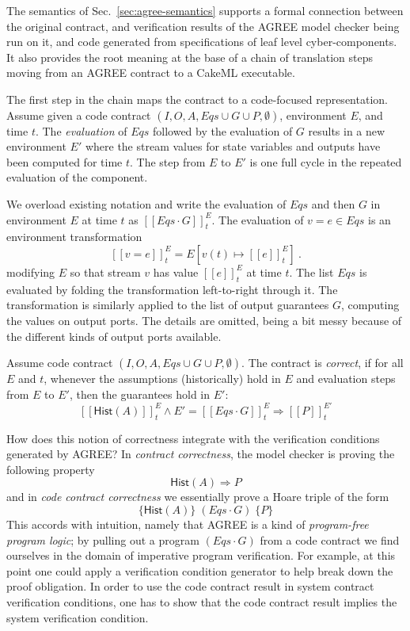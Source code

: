 \documentclass[global,twocolumn]{svjour}
\newcommand{\konst}[1]{\ensuremath{\mathsf{#1}}}
\newcommand{\imp}{\Rightarrow}
\newcommand{\set}[1]{\ensuremath{\{ {#1} \}}}
\newcommand{\sem}[1]{\ensuremath{[\![ #1 ]\!]}}
\newcommand{\Eqs}{\ensuremath{\mathit{Eqs}}}
\newcommand{\secref}[1]{Sec.~\ref{#1}}
\begin{document}
The semantics of \secref{sec:agree-semantics} supports a formal connection between the original contract, and verification results of the AGREE model checker being run on it, and code generated from specifications of leaf level cyber-components.
%
It also provides the root meaning at the base of a chain of translation steps moving from an AGREE contract to a CakeML executable.

The first step in the chain maps the contract to a code-focused representation.
Assume given a code contract $(I,O,A,\mathit{Eqs} \cup G \cup P,\emptyset)$, environment $E$, and time $t$.
%
The \emph{evaluation} of $\mathit{Eqs}$ followed by the evaluation of $G$ results in a new environment $E'$ where the stream values for state variables and outputs have been computed for time $t$.
%
The step from $E$ to $E'$ is one full cycle in the repeated evaluation of the component.

\begin{definition}[Evaluation]
We overload existing notation and write the evaluation of $\mathit{Eqs}$ and then $G$ in environment $E$ at time $t$ as $\sem{\mathit{Eqs}\cdot G}^E_t$.
%
The evaluation of $v = e \in {\Eqs}$ is an environment transformation
%
\[
 \sem{v = e}^E_t = E[v(t) \mapsto\sem{e}^E_t] \ .
\]
%
modifying $E$ so that stream $v$ has value $\sem{e}^E_t$ at time $t$.
%
The list {\Eqs} is evaluated by folding the transformation left-to-right through it.
%
The transformation is similarly applied to the list of output guarantees $G$, computing the values on output ports.
%
The details are omitted, being a bit messy because of the different kinds of output ports available.
\end{definition}

\begin{definition}
Assume code contract $(I,O,A,\mathit{Eqs} \cup G \cup P,\emptyset)$.
%
The contract is \emph{correct}, if for all $E$ and $t$, whenever the assumptions (historically) hold in $E$ and evaluation steps from $E$ to $E'$, then the guarantees hold in $E'$:
%
\[
\sem{\konst{Hist}(A)}^E_t \land E' = \sem{\mathit{Eqs} \cdot G}^E_t \imp \sem{P}^{E'}_t
\]
%
\end{definition}

How does this notion of correctness integrate with the verification conditions generated by AGREE?
%
In \emph{contract correctness}, the model checker is proving the following property
%
\[
\konst{Hist}(A) \imp P
\]
%
and in \emph{code contract correctness} we essentially prove a Hoare triple of the form
%
\[
\set{\konst{Hist}(A)}\; (\mathit{Eqs} \cdot G) \; \set{P}
\]
%
This accords with intuition, namely that AGREE is a kind of \emph{program-free program logic};
%
by pulling out a program $(\mathit{Eqs}\cdot G)$ from a code contract we find ourselves in the domain of imperative program verification.
%
For example, at this point one could apply a verification condition generator to help break down the proof obligation.
%
In order to use the code contract result in system contract verification conditions, one has to show that the code contract result implies the system verification condition.
\end{document}
